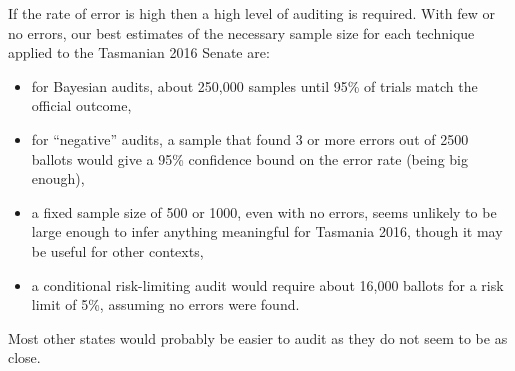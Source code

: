 \documentclass[10pt,a4paper]{article}
\begin{document}
If the rate of error is high then a high level of auditing is required.  With few or no errors, our best estimates of the necessary sample size for each technique applied to the Tasmanian 2016 Senate are:
\begin{itemize}
	\item for Bayesian audits, about 250,000 samples until 95\% of trials match the official outcome,
	\item for ``negative'' audits, a sample that found 3 or more errors out of 2500 ballots would give a 95\% confidence bound on the error rate (being big enough),
	\item a fixed sample size of 500 or 1000, even with no errors, seems unlikely to be large enough to infer anything meaningful for Tasmania 2016, though it may be useful for other contexts,
	\item a conditional risk-limiting audit  would require about 16,000 ballots for a risk limit of 5\%, assuming no errors were found.
\end{itemize}

Most other states would probably be easier to audit as they do not seem to be as close.
\end{document}
